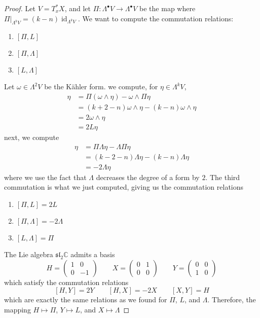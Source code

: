 \documentclass[psamsfonts, 12pt]{amsart}
\theoremstyle{definition}
\theoremstyle{remark}
\renewcommand{\sl}{\mathfrak{sl}}
\newcommand{\C}{\mathbb{C}}
\DeclareMathOperator{\id}{id}
\begin{document}
\begin{proof}
Let $V = T^*_xX$, and let $\Pi : \Lambda^\bullet V \to \Lambda^\bullet V$ be the map
where $\Pi\vert_{\Lambda^kV} = (k-n)\id_{\Lambda^kV}$. We want to compute the
commutation relations:
\begin{enumerate}
  \item $[\Pi,L]$
  \item $[\Pi,\Lambda]$
  \item $[L,\Lambda]$
\end{enumerate}
Let $\omega \in \Lambda^2V$ be the K\"ahler form. we compute, for
$\eta \in \Lambda^kV$,
\begin{align*}
[\Pi, L]\eta &= \Pi(\omega \wedge \eta) - \omega \wedge \Pi\eta \\
&= (k+2-n)\omega\wedge\eta - (k-n)\omega\wedge\eta \\
&= 2\omega\wedge \eta \\
&= 2L\eta
\end{align*}
next, we compute
\begin{align*}
[\Pi, \Lambda]\eta &= \Pi\Lambda\eta - \Lambda\Pi\eta \\
&= (k-2-n)\Lambda\eta - (k-n)\Lambda\eta \\
&= -2\Lambda\eta
\end{align*}
where we use the fact that $\Lambda$ decreases the degree of a form by $2$. The third
commutation is what we just computed, giving us the commutation relations
\begin{enumerate}
  \item $[\Pi, L] = 2L$
  \item $[\Pi,\Lambda] = -2\Lambda$
  \item $[L,\Lambda] = \Pi$
\end{enumerate}
The Lie algebra $\sl_2\C$ admits a basis
\[
H = \begin{pmatrix}
1 & 0 \\
0 & -1
\end{pmatrix} \qquad X = \begin{pmatrix}
0 & 1 \\
0 & 0
\end{pmatrix} \qquad Y = \begin{pmatrix}
0 & 0 \\
1 & 0
\end{pmatrix}
\]
which satisfy the commutation relations
\[
[H,Y] = 2Y \qquad [H,X] = -2X \qquad [X,Y] = H
\]
which are exactly the same relations as we found for $\Pi$, $L$, and $\Lambda$.
Therefore, the mapping $H \mapsto \Pi$, $Y \mapsto L$, and $X \mapsto \Lambda$

\end{proof}
\end{document}
